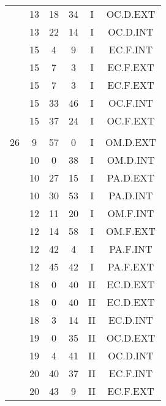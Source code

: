 \documentclass[12pt, a4paper]{article}
\begin{document}
\begin{multicols}{3}
{\begin{tabular}{c c c c c c}
	 	 	 	 & 13 & 18 & 34 & I & OC.D.EXT\\%
	 	 	 	 & 13 & 22 & 14 & I & OC.D.INT\\%
	 	 	 	 & 15 & 4 & 9 & I & EC.F.INT\\%
	 	 	 	 & 15 & 7 & 3 & I & EC.F.EXT\\%
	 	 	 	 & 15 & 7 & 3 & I & EC.F.EXT\\%
	 	 	 	 & 15 & 33 & 46 & I & OC.F.INT\\%
	 	 	 	 & 15 & 37 & 24 & I & OC.F.EXT\\%
	 	 	 	 & & & & & \\%
	 	 	 	26 & 9 & 57 & 0 & I & OM.D.EXT\\%
	 	 	 	 & 10 & 0 & 38 & I & OM.D.INT\\%
	 	 	 	 & 10 & 27 & 15 & I & PA.D.EXT\\%
	 	 	 	 & 10 & 30 & 53 & I & PA.D.INT\\%
	 	 	 	 & 12 & 11 & 20 & I & OM.F.INT\\%
	 	 	 	 & 12 & 14 & 58 & I & OM.F.EXT\\%
	 	 	 	 & 12 & 42 & 4 & I & PA.F.INT\\%
	 	 	 	 & 12 & 45 & 42 & I & PA.F.EXT\\%
	 	 	 	 & 18 & 0 & 40 & II & EC.D.EXT\\%
	 	 	 	 & 18 & 0 & 40 & II & EC.D.EXT\\%
	 	 	 	 & 18 & 3 & 14 & II & EC.D.INT\\%
	 	 	 	 & 19 & 0 & 35 & II & OC.D.EXT\\%
	 	 	 	 & 19 & 4 & 41 & II & OC.D.INT\\%
	 	 	 	 & 20 & 40 & 37 & II & EC.F.INT\\%
	 	 	 	 & 20 & 43 & 9 & II & EC.F.EXT\\%

\end{tabular}}
\end{multicols}
\end{document}

